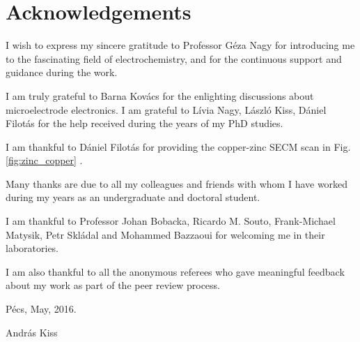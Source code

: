 \chapter*{Acknowledgements}
I wish to express my sincere gratitude to Professor Géza Nagy for introducing me to the fascinating field of electrochemistry, and for the continuous support and guidance during the work. 

\vspace{5mm}

I am truly grateful to Barna Kovács for the enlighting discussions about microelectrode electronics.
I am grateful to Lívia Nagy, László Kiss, Dániel Filotás for the help received during the years of my PhD studies.

\vspace{5mm}

I am thankful to Dániel Filotás for providing the copper-zinc SECM scan in Fig. \ref{fig:zinc_copper}
.
\vspace{5mm}

Many thanks are due to all my colleagues and friends with whom I have worked during my years as an undergraduate and doctoral student.

\vspace{5mm}

I am thankful to Professor Johan Bobacka, Ricardo M. Souto, Frank-Michael Matysik, Petr Skládal and Mohammed Bazzaoui for welcoming me in their laboratories.

\vspace{5mm}

I am also thankful to all the anonymous referees who gave meaningful feedback about my work as part of the peer review process.

\vspace{20mm}

Pécs, May, 2016.

\vspace{5mm}

András Kiss
